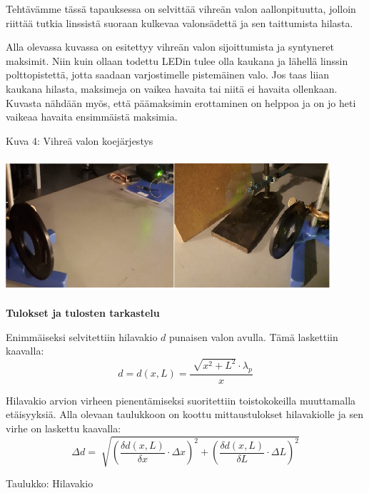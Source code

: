 \documentclass[11pt,a4paper]{article}
\begin{document}
Tehtävämme tässä tapauksessa on selvittää vihreän valon aallonpituutta, jolloin riittää tutkia linssistä suoraan kulkevaa valonsädettä ja sen taittumista hilasta. 

Alla olevassa kuvassa on esitettyy vihreän valon sijoittumista ja syntyneret maksimit. Niin kuin ollaan todettu LEDin tulee olla kaukana ja lähellä linssin polttopistettä, jotta saadaan varjostimelle pistemäinen valo. Jos taas liian kaukana hilasta, maksimeja on vaikea havaita tai niitä ei havaita ollenkaan. Kuvasta nähdään myös, että päämaksimin erottaminen on helppoa ja on jo heti vaikeaa havaita ensimmäistä maksimia. 

\pagebreak

\noindent Kuva 4: Vihreä valon koejärjestys

\vspace{0.3cm}

\includegraphics[height=5cm, width=12cm]{2.png}

\vspace{0.5cm}

\noindent\Large\textbf{Tulokset ja tulosten tarkastelu }

\vspace{0.5cm}

\noindent Enimmäiseksi selvitettiin hilavakio $d$ punaisen valon avulla. Tämä laskettiin kaavalla:
$$d=d(x, L)=\frac{\sqrt[]{{x}^2 + {L}^2}\cdot {\lambda}_p}{x} $$

Hilavakio arvion virheen pienentämiseksi suoritettiin toistokokeilla muuttamalla etäisyyksiä. Alla olevaan taulukkoon on koottu mittaustulokset hilavakiolle ja sen virhe on laskettu kaavalla: 
$$\Delta d= \sqrt[]{(\frac{\delta d(x, L)}{\delta x}\cdot \Delta x)^2 + (\frac{\delta d(x, L)}{\delta L}\cdot \Delta L)^2} $$

\vspace{0.3cm}

\noindent Taulukko: Hilavakio 

\vspace{0.3cm}
\end{document}

